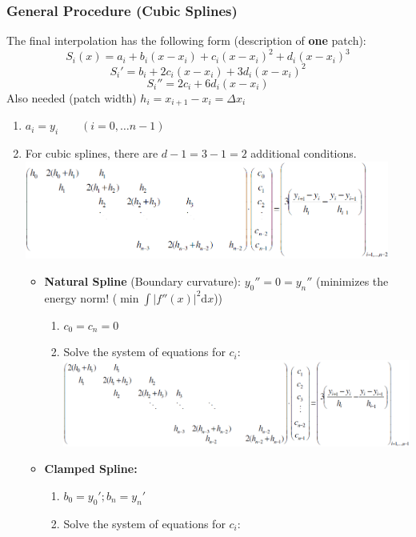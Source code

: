 \subsubsection{General Procedure (Cubic Splines)}
The final interpolation has the following form (description of \textbf{one} patch):
$$\boxed{S_i(x) = a_i + b_i(x-x_i) + c_i(x-x_i)^2 + d_i(x-x_i)^3}$$
$$S_i' = b_i + 2c_i(x-x_i)+3d_i(x-x_i)^2$$
$$S_i'' = 2c_i + 6 d_i (x-x_i)$$
Also needed (patch width) $h_i = x_{i+1} - x_i = \Delta x_i$
\begin{enumerate}
  \item $a_i = y_i \qquad (i=0,\ldots n-1)$
  \item For cubic splines, there are $d-1=3-1=2$ additional conditions.\\ \includegraphics[width=12cm]{./bilder/1d_spline_gleichungssystem}
\newpage
    \begin{itemize}
      \item \textbf{Natural Spline} (Boundary curvature): $y_0''=0=y_n''$ (minimizes the energy norm! ($\min \int |f''(x)|^2 \mathrm{d}x$))
        \begin{enumerate}
          \item $c_0 = c_n = 0$
          \item Solve the system of equations for $c_i$:\\
            \includegraphics[width=13cm]{./bilder/1d_spline_natural_gleichungssystem}
        \end{enumerate}
       \item \textbf{Clamped Spline:}
         \begin{enumerate}
           \item $b_0 = y_0'; b_n=y_n'$
           \item Solve the system of equations for $c_i$:\\

\end{enumerate}
\end{itemize}
\end{enumerate}
